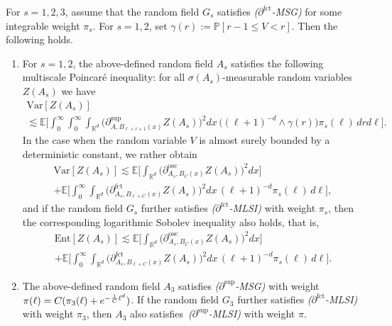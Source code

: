 \documentclass[10pt]{amsart}
\theoremstyle{definition}\newtheorem{defi}[theo]{Definition}\newtheorem{rema}[theo]{Remark}\newtheorem{exam}[theo]{Example}\newtheorem{exem}[theo]{Example}\newtheorem{nota}[theo]{Notation}
\newcommand{\R}{\mathbb R}
\newcommand{\expecM}[1]{\mathbb{E}\bigg[#1 \bigg]}
\newcommand{\pr}[1]{\mathbb{P}\left[#1 \right]}
\newcommand{\parfct}[1]{\partial_{#1}^{\operatorname{fct}}}
\newcommand{\parsup}[1]{\partial_{#1}^{\operatorname{\sup}}}
\newcommand{\osc}{\partial^{\mathrm{osc}}}
\newcommand{\oscd}[1]{\mathrel{\osc_{#1}}}
\newcommand{\var}[1]{\mathrm{Var}\left[#1\right]}
\newcommand{\ent}[1]{\mathrm{Ent}\!\left[#1\right]}
\newcommand*{\romanenumi}{\renewcommand*{\theenumi}{\roman{enumi}}}
\begin{document}
\begin{prop}\label{prop:ex-dep-color}
For $s=1,2,3$, assume that the random field $G_s$ satisfies \emph{($\parfct{}$-MSG)} for some integrable weight $\pi_s$. For $s=1,2$, set $\gamma(r):=\pr{r-1\le V<r}$. Then the following holds.
\begin{enumerate}\romanenumi
\item \label{prop3.8.1}For $s=1,2$, the above-defined random field $A_s$ satisfies the following multiscale Poincaré inequality: for all $\sigma(A_s)$-measurable random variables $Z(A_s)$ we have
\begin{multline}\label{eq:s1-gen}
\var{Z(A_s)}\\
\lesssim
\expecM{\int_0^\infty\int_{0}^\infty\int_{\R^d}\Big(\parsup{A,B_{\ell+r+1}(x)}Z(A_s)\Big)^2dx\,\big((\ell+1)^{-d}\wedge\gamma(r)\big)\pi_s(\ell)\,drd\ell}.
\end{multline}
In the case when the random variable $V$ is almost surely bounded by a deterministic constant, we rather obtain
\begin{multline}\label{eq:s1-bound}
\var{Z(A_s)}\lesssim\expecM{\int_{\R^d}\Big(\oscd{A_s,B_{C}(x)}Z(A_s)\Big)^2dx}\\
+\expecM{\int_0^\infty\int_{\R^d}\Big(\parfct{A_s,B_{\ell+C}(x)}Z(A_s)\Big)^2dx\,(\ell+1)^{-d}\pi_s(\ell)\,d\ell},
\end{multline}
and if the random field $G_s$ further satisfies \emph{($\parfct{}$-MLSI)} with weight $\pi_s$, then the corresponding logarithmic Sobolev inequality also holds, that is,
\begin{multline*}
\ent{Z(A_s)}\lesssim\expecM{\int_{\R^d}\Big(\oscd{A_s,B_{C}(x)}Z(A_s)\Big)^2dx}\\
+\expecM{\int_0^\infty\int_{\R^d}\Big(\parfct{A_s,B_{\ell+C}(x)}Z(A_s)\Big)^2dx\,(\ell+1)^{-d}\pi_s(\ell)\,d\ell}.
\end{multline*}
\item \label{prop3.8.2}The above-defined random field $A_3$ satisfies \emph{($\parsup{}$-MSG)} with weight $\pi(\ell)\linebreak=C(\pi_3(\ell)+e^{-\frac1C\ell^d})$. If the random field $G_3$ further satisfies \emph{($\parfct{}$-MLSI)} with weight $\pi_3$, then $A_3$ also satisfies~\emph{($\parsup{}$-MLSI)} with weight $\pi$.
\qedhere
\end{enumerate}
\end{prop}
\end{document}
